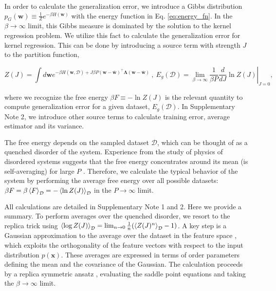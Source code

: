 \documentclass[11pt]{article}
\def\bLambda{{\bm \Lambda}}
\def\bLambda{{\bf{H}}}
\def\bLambda{{\bm \Lambda}}
\def\w{{\mathbf w}}
\def\x{{\mathbf x}}
\begin{document}
In order to calculate the generalization error, we introduce a Gibbs distribution $p_G(\w)\equiv \frac{1}{Z}e^{-\beta H(\w)}
$ with the energy function in Eq. \eqref{eq:energy_fn}. In the $\beta \to \infty$ limit, this Gibbs measure is dominated by the solution to the kernel regression problem. We utilize this fact to calculate the generalization error for kernel regression. This can be done by introducing a source term with strength $J$ to the partition function,
\begin{linenomath*}\begin{equation}
     Z(J) = \int d\w e^{-\beta H(\w,\mathcal{D})+{J \beta P} (\w-\bar\w)^\top\bLambda(\w-\bar\w)} \ , \ E_g(\mathcal{D}) = \left.\lim_{\beta\to \infty}\frac{1}{\beta P} \frac{d}{d J}\ln Z(J)\right |_{J=0},
\end{equation}\end{linenomath*}
where we recognize the free energy $\beta F \equiv -\ln Z(J)$ is the relevant quantity to compute generalization error for a given dataset, $E_g(\mathcal{D})$. In Supplementary Note 2, we introduce other source terms to calculate training error, average estimator and its variance.

The free energy depends on the sampled dataset $\mathcal{D}$, which can be thought of as a quenched disorder of the system. Experience from the study of physics of disordered systems suggests that the free energy concentrates around its mean (is self-averaging) for large $P$ \cite{mezard1987spin}. Therefore, we calculate the typical behavior of the system by performing the average free energy over all possible datasets: $\beta  F = \beta \left< F  \right >_{\mathcal D}= -  \braket{\ln Z(J)}_{\mathcal{D}}$ in the $P\to\infty$ limit. 

All calculations are detailed in Supplementary Note 1 and 2. Here we provide a summary. To perform averages over the quenched disorder, we resort to the replica trick \cite{spinGlassReview} using $\braket{\log Z(J)}_{\mathcal{D}} = \lim_{n\to 0}\frac{1}{n}(\braket{Z(J)^n}_{\mathcal{D}}-1)$.
A key step is a Gaussian approximation to the average over the dataset in the feature space \cite{sompolinsky1999statistical}, which exploits the orthogonality of the feature vectors with respect to the input distribution $p(\x)$. These averages are expressed in terms of order parameters defining the mean and the covariance of the Gaussian. The calculation proceeds by a replica symmetric ansatz \cite{mezard1987spin},
evaluating the saddle point equations and taking the $\beta\to\infty$ limit. 
\end{document}
